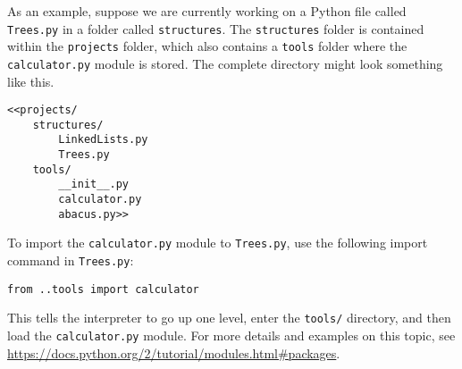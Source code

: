 As an example, suppose we are currently working on a Python file called \texttt{Trees.py} in a folder called \texttt{structures}.
The \texttt{structures} folder is contained within the \texttt{projects} folder, which also contains a \texttt{tools} folder where the \texttt{calculator.py} module is stored.
The complete directory might look something like this.

\begin{lstlisting}
<<projects/
    structures/
        LinkedLists.py
        Trees.py
    tools/
        __init__.py
        calculator.py
        abacus.py>>
\end{lstlisting}

To import the \texttt{calculator.py} module to \texttt{Trees.py}, use the following import command in \texttt{Trees.py}:

\begin{lstlisting}
from ..tools import calculator
\end{lstlisting}

This tells the interpreter to go up one level, enter the \texttt{tools/} directory, and then load the \texttt{calculator.py} module.
For more details and examples on this topic, see \url{https://docs.python.org/2/tutorial/modules.html\#packages}.
